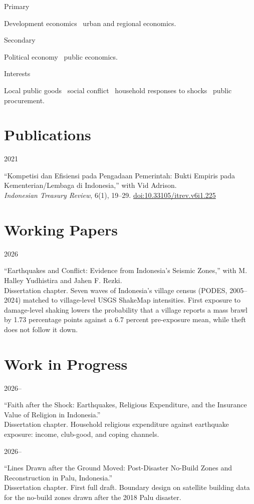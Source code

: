 \documentclass[11pt,a4paper]{article}
\newlength{\datecol}\setlength{\datecol}{0.155\textwidth}
\newlength{\bodycol}\setlength{\bodycol}{0.815\textwidth}
\newcommand{\entry}[2]{%
  \noindent
  \begin{minipage}[t]{\datecol}%
    \strut\raggedright\small\color{muted}#1%
  \end{minipage}%
  \hfill
  \begin{minipage}[t]{\bodycol}%
    \strut #2%
  \end{minipage}%
  \par\vspace{0.16em}}
\newcommand{\org}[1]{{\small\color{muted}#1}}
\begin{document}
\entry{Primary}{Development economics \textperiodcentered\ urban and regional economics.}
\entry{Secondary}{Political economy \textperiodcentered\ public economics.}
\entry{Interests}{Local public goods \textperiodcentered\ social conflict
  \textperiodcentered\ household responses to shocks \textperiodcentered\ public
  procurement.}

\section{Publications}

\entry{2021}{%
  ``Kompetisi dan Efisiensi pada Pengadaan Pemerintah: Bukti Empiris pada
  Kementerian/Lembaga di Indonesia,'' with Vid Adrison.\\
  \org{\emph{Indonesian Treasury Review}, 6(1), 19--29.
  \href{https://doi.org/10.33105/itrev.v6i1.225}{doi:10.33105/itrev.v6i1.225}}}

\section{Working Papers}

\entry{2026}{%
  ``Earthquakes and Conflict: Evidence from Indonesia's Seismic Zones,''
  with M. Halley Yudhistira and Jahen F. Rezki.\\
  \org{Dissertation chapter. Seven waves of Indonesia's village census
  (PODES, 2005--2024) matched to village-level USGS ShakeMap intensities.
  First exposure to damage-level shaking lowers the probability that a village
  reports a mass brawl by 1.73 percentage points against a 6.7 percent
  pre-exposure mean, while theft does not follow it down.}}

\section{Work in Progress}

\entry{2026--}{%
  ``Faith after the Shock: Earthquakes, Religious Expenditure, and the
  Insurance Value of Religion in Indonesia.''\\
  \org{Dissertation chapter. Household religious expenditure against
  earthquake exposure: income, club-good, and coping channels.}}

\entry{2026--}{%
  ``Lines Drawn after the Ground Moved: Post-Disaster No-Build Zones and
  Reconstruction in Palu, Indonesia.''\\
  \org{Dissertation chapter. First full draft. Boundary design on satellite
  building data for the no-build zones drawn after the 2018 Palu disaster.}}
\end{document}
